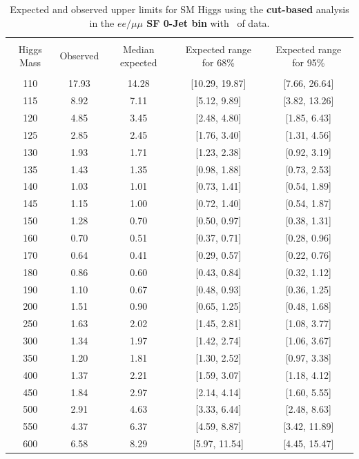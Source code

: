 \begin{table}[hbp!]
\begin{center}
\begin{tabular}{c c c c c}
\hline
\vspace{-3mm} && \\
 Higgs Mass & Observed  & Median expected & Expected range for 68\% & Expected range for 95\%   \\
\vspace{-3mm} && \\
\hline
110 & 17.93 & 14.28 & [10.29, 19.87] & [7.66, 26.64] \\
115 & 8.92 & 7.11 & [5.12, 9.89] & [3.82, 13.26] \\
120 & 4.85 & 3.45 & [2.48, 4.80] & [1.85, 6.43] \\
125 & 2.85 & 2.45 & [1.76, 3.40] & [1.31, 4.56] \\
130 & 1.93 & 1.71 & [1.23, 2.38] & [0.92, 3.19] \\
135 & 1.43 & 1.35 & [0.98, 1.88] & [0.73, 2.53] \\
140 & 1.03 & 1.01 & [0.73, 1.41] & [0.54, 1.89] \\
145 & 1.15 & 1.00 & [0.72, 1.40] & [0.54, 1.87] \\
150 & 1.28 & 0.70 & [0.50, 0.97] & [0.38, 1.31] \\
160 & 0.70 & 0.51 & [0.37, 0.71] & [0.28, 0.96] \\
170 & 0.64 & 0.41 & [0.29, 0.57] & [0.22, 0.76] \\
180 & 0.86 & 0.60 & [0.43, 0.84] & [0.32, 1.12] \\
190 & 1.10 & 0.67 & [0.48, 0.93] & [0.36, 1.25] \\
200 & 1.51 & 0.90 & [0.65, 1.25] & [0.48, 1.68] \\
250 & 1.63 & 2.02 & [1.45, 2.81] & [1.08, 3.77] \\
300 & 1.34 & 1.97 & [1.42, 2.74] & [1.06, 3.67] \\
350 & 1.20 & 1.81 & [1.30, 2.52] & [0.97, 3.38] \\
400 & 1.37 & 2.21 & [1.59, 3.07] & [1.18, 4.12] \\
450 & 1.84 & 2.97 & [2.14, 4.14] & [1.60, 5.55] \\
500 & 2.91 & 4.63 & [3.33, 6.44] & [2.48, 8.63] \\
550 & 4.37 & 6.37 & [4.59, 8.87] & [3.42, 11.89] \\
600 & 6.58 & 8.29 & [5.97, 11.54] & [4.45, 15.47] \\
\hline
\end{tabular}
\caption{Expected and observed upper limits for SM Higgs using the
  {\bf cut-based} analysis in the {\bf $ee/\mu\mu$ SF 0-Jet bin} with \intlumiEightTeV\ of data.}
\label{tab:cutbase_uls_0jsf}
\end{center}
\end{table}
